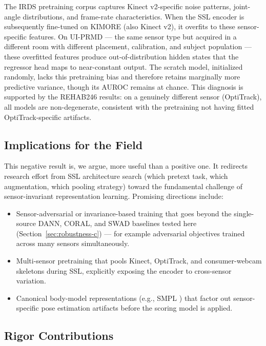 \documentclass[10pt,journal]{IEEEtran}
\begin{document}
The IRDS pretraining corpus captures Kinect v2-specific noise patterns, joint-angle distributions, and frame-rate characteristics. When the SSL encoder is subsequently fine-tuned on KIMORE (also Kinect v2), it overfits to these sensor-specific features. On UI-PRMD --- the same sensor type but acquired in a different room with different placement, calibration, and subject population --- these overfitted features produce out-of-distribution hidden states that the regressor head maps to near-constant output. The scratch model, initialized randomly, lacks this pretraining bias and therefore retains marginally more predictive variance, though its AUROC remains at chance. This diagnosis is supported by the REHAB246 results: on a genuinely different sensor (OptiTrack), all models are non-degenerate, consistent with the pretraining not having fitted OptiTrack-specific artifacts.

\subsection{Implications for the Field}
\label{sec:implications}

This negative result is, we argue, more useful than a positive one. It redirects research effort from SSL architecture search (which pretext task, which augmentation, which pooling strategy) toward the fundamental challenge of sensor-invariant representation learning. Promising directions include:
\begin{itemize}
    \item Sensor-adversarial or invariance-based training that goes beyond the single-source DANN, CORAL, and SWAD baselines tested here (Section~\ref{sec:robustness-c}) --- for example adversarial objectives trained across many sensors simultaneously.
    \item Multi-sensor pretraining that pools Kinect, OptiTrack, and consumer-webcam skeletons during SSL, explicitly exposing the encoder to cross-sensor variation.
    \item Canonical body-model representations (e.g., SMPL \cite{loper2015smpl}) that factor out sensor-specific pose estimation artifacts before the scoring model is applied.
\end{itemize}

\subsection{Rigor Contributions}
\label{sec:rigor}
\end{document}
